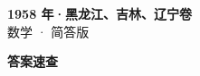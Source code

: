 \documentclass[zihao=-4, a4paper]{ctexart}
\begin{document}
\begin{center}
  {\Large\bfseries 1958 年·黑龙江、吉林、辽宁卷}\\[4pt]
  {\large 数学 · 简答版}
\end{center}
\medskip
{}

\clearpage
{}
\begin{center}{\Large\bfseries 答案速查}\end{center}
\medskip

\end{document}
